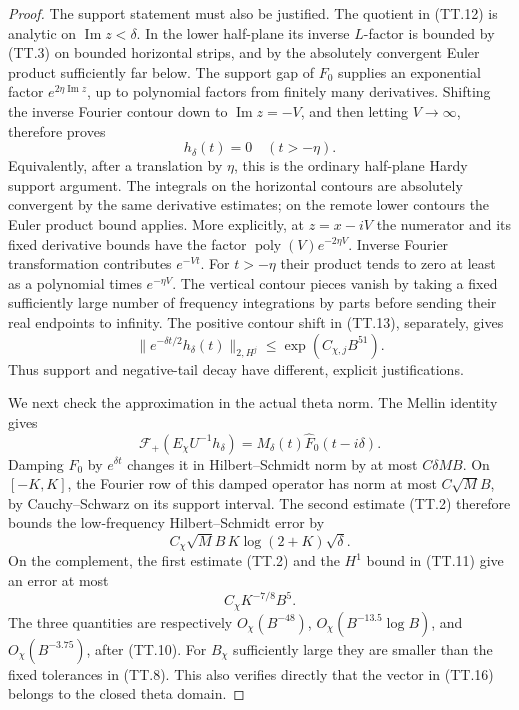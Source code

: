 \begin{proof}
The support statement must also be justified.
The quotient in (TT.12) is analytic on
\(\operatorname{Im}z<\delta\).
In the lower half-plane its inverse \(L\)-factor is bounded
by (TT.3) on bounded horizontal strips, and by the absolutely
convergent Euler product sufficiently far below.
The support gap of \(F_0\) supplies an exponential factor
\(e^{2\eta\operatorname{Im}z}\), up to polynomial factors
from finitely many derivatives.
Shifting the inverse Fourier contour down to
\(\operatorname{Im}z=-V\), and then letting \(V\to\infty\),
therefore proves
\[
                         h_\delta(t)=0\quad(t>-\eta).
 \tag{TT.14}
\]
Equivalently, after a translation by \(\eta\), this is
the ordinary half-plane Hardy support argument.
The integrals on the horizontal contours are absolutely
convergent by the same derivative estimates; on the remote
lower contours the Euler product bound applies.
More explicitly, at \(z=x-iV\) the numerator and its
fixed derivative bounds have the factor
\(\operatorname{poly}(V)e^{-2\eta V}\).
Inverse Fourier transformation contributes \(e^{-Vt}\).
For \(t>-\eta\) their product tends to zero at least
as a polynomial times \(e^{-\eta V}\).
The vertical contour pieces vanish by taking a fixed
sufficiently large number of frequency integrations by
parts before sending their real endpoints to infinity.
The positive contour shift in (TT.13), separately, gives
\[
       \|e^{-\delta t/2}h_\delta(t)\|_{2,H^j}
                           \leq\exp(C_{\chi,j}B^{51}).
 \tag{TT.15}
\]
Thus support and negative-tail decay have different,
explicit justifications.

We next check the approximation in the actual theta norm.
The Mellin identity gives
\[
 \mathcal F_+(E_\chi U^{-1}h_\delta)
               =M_\delta(t)\widehat F_0(t-i\delta).
 \tag{TT.16}
\]
Damping \(F_0\) by \(e^{\delta t}\) changes it in
Hilbert--Schmidt norm by at most \(C\delta MB\).
On \([-K,K]\), the Fourier row of this damped operator
has norm at most \(C\sqrt M B\), by Cauchy--Schwarz on
its support interval.
The second estimate (TT.2) therefore bounds the
low-frequency Hilbert--Schmidt error by
\[
              C_\chi \sqrt M B\,K\log(2+K)\sqrt\delta.
 \tag{TT.17}
\]
On the complement, the first estimate (TT.2) and the
\(H^1\) bound in (TT.11) give an error at most
\[
                        C_\chi K^{-7/8}B^5 .
 \tag{TT.18}
\]
The three quantities are respectively
\(O_\chi(B^{-48})\),
\(O_\chi(B^{-13.5}\log B)\), and
\(O_\chi(B^{-3.75})\), after (TT.10).
For \(B_\chi\) sufficiently large they are smaller than
the fixed tolerances in (TT.8).
This also verifies directly that the vector in (TT.16)
belongs to the closed theta domain.


\end{proof}
